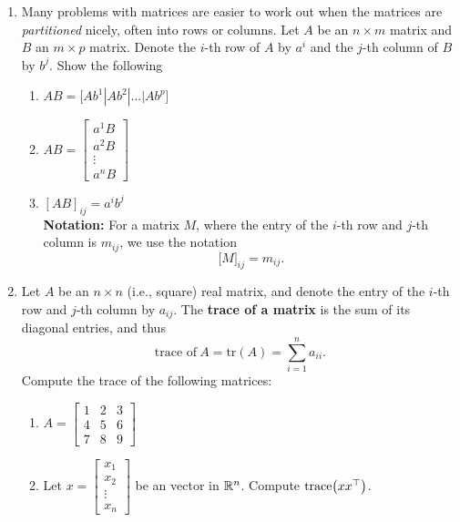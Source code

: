 \documentclass[letterpaper]{article}
\begin{document}
\begin{enumerate}

\item Many problems with matrices are easier to work out when the matrices are \textit{partitioned} nicely, often into rows or columns. Let $A$ be an $n \times m$ matrix and $B$ an $m \times p$ matrix. Denote the $i$-th row of $A$ by $a^i$ and the $j$-th column of $B$ by $b^j$. Show the following

\begin{enumerate}
\setlength{\itemsep}{.1in}
\renewcommand{\labelenumi}{(\alph{enumi})}
\item $AB=\big[ A b^1|Ab^2| \ldots | Ab^p \big]$

\item $AB=\begin{bmatrix}  a^1 B \\ a^2 B \\ \vdots \\ a^n B \end{bmatrix}$

\item $[AB]_{ij} = a^i b^j$\\

\textbf{Notation:} For a matrix $M$, where the entry of the $i$-th row and $j$-th column is $m_{ij}$, we use the notation
$$\big[ M \big]_{ij} = m_{ij}.$$

\end{enumerate}



\item Let $A$ be an $n \times n$ (i.e., square) real matrix, and denote the entry of the $i$-th row and $j$-th column by $a_{ij}$. The \textbf{trace of a matrix} is the sum of its diagonal entries, and thus
    $$\mbox{trace of}~A = \mathrm{tr}(A) = \sum \limits_{i=1}^{n} a_{ii}.$$ Compute the trace of the following matrices:

\begin{enumerate}
\setlength{\itemsep}{.1in}
\renewcommand{\labelenumi}{(\alph{enumi})}
\item $A=\left[  \begin{array}{ccc} 1 & 2 & 3\\ 4 & 5 &6\\ 7 & 8 & 9 \end{array}\right]$

\item Let $x=\begin{bmatrix}  x_1\\ x_2 \\ \vdots \\ x_n\end{bmatrix}$ be an vector in $\mathbb R^n$. Compute $ \mathrm{trace} \big( x x^\top \big)$.


\end{enumerate}
\end{enumerate}
\end{document}

